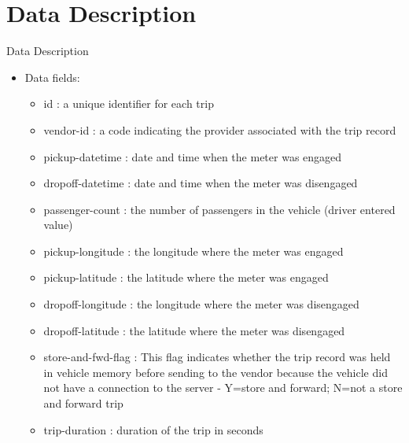 \documentclass[
 size=14pt,
 paper=smartboard,  %
 mode=present, 		%
 display=slides, 	%
 style=tuliplab,  	%
 pauseslide,
 fleqn,leqno]{powerdot}
\begin{document}
\section{Data Description}



\begin{slide}{Data Description}


\begin{itemize}

\item
Data fields:

\begin{itemize}
\item
id : a unique identifier for each trip

\item
vendor-id : a code indicating the provider associated with the trip record

\item
pickup-datetime : date and time when the meter was engaged

\item
dropoff-datetime : date and time when the meter was disengaged

\item
passenger-count : the number of passengers in the vehicle (driver entered value)

\item
pickup-longitude : the longitude where the meter was engaged

\item
pickup-latitude : the latitude where the meter was engaged

\item
dropoff-longitude : the longitude where the meter was disengaged

\item
dropoff-latitude : the latitude where the meter was disengaged

\item
store-and-fwd-flag : This flag indicates whether the trip record was held in vehicle memory before sending to the vendor because the vehicle did not have a connection to the server - Y=store and forward; N=not a store and forward trip

\item
trip-duration : duration of the trip in seconds


\end{itemize}
\end{itemize}
\end{slide}
\end{document}
